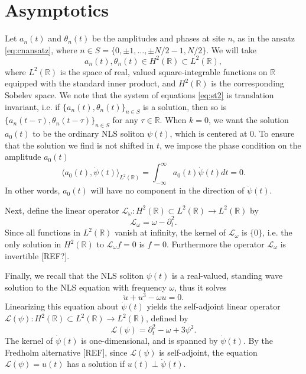 \documentclass[11pt,reqno]{amsart}
\def\R{{\mathbb R}}
\def\calL{{\mathcal L}}
\def\Lw{{\mathcal{L}_\omega}}
\begin{document}
\section{Asymptotics}\label{app:asymp}

Let $a_n(t)$ and $\theta_n(t)$ be the amplitudes and phases at site $n$, as in the ansatz \cref{eq:cnansatz}, where $n \in S = \{ 0, \pm 1, \dots, \pm N/2-1, N/2 \}$. We will take 
\[
a_n(t), \theta_n(t) \in H^2(\R) \subset L^2(\R),
\]
where $L^2(\R)$ is the space of real, valued square-integrable functions on $\R$ equipped with the standard inner product, and $H^2(\R)$ is the corresponding Sobelev space. We note that the system of equations \cref{eq:st2} is translation invariant, i.e. if $\{ a_n(t), \theta_n(t)\}_{n\in S}$ is a solution, then so is $\{ a_n(t-\tau), \theta_n(t-\tau)\}_{n\in S}$ for any $\tau \in \R$. When $k = 0$, we want the solution $a_0(t)$ to be the ordinary NLS soliton $\psi(t)$, which is centered at 0. To ensure that the solution we find is not shifted in $t$, we impose the phase condition on the amplitude $a_0(t)$
\begin{equation}\label{eq:phasecond}
\langle a_0(t), \dot{\psi}(t) \rangle_{L^2(\R)} = \int_{-\infty}^\infty a_0(t) \dot{\psi}(t) dt = 0.
\end{equation}
In other words, $a_0(t)$ will have no component in the direction of $\dot{\psi}(t)$.

Next, define the linear operator $\Lw: H^2(\R) \subset L^2(\R) \rightarrow L^2(\R)$ by
\begin{equation}\label{eq:Lw}
\Lw = \omega - \partial_t^2.
\end{equation}
Since all functions in $L^2(\R)$ vanish at infinity, the kernel of $\Lw$ is $\{0\}$, i.e. the only solution in $H^2(\R)$ to $\Lw f = 0$ is $f = 0$. Furthermore the operator $\Lw$ is invertible [REF?].

Finally, we recall that the NLS soliton $\psi(t)$ is a real-valued, standing wave solution to the NLS equation with frequency $\omega$, thus it solves 
\begin{equation}\label{eq:NLSreal}
\ddot{u} + u^3 - \omega u = 0. 
\end{equation}
Linearizing this equation about $\dot{\psi}(t)$ yields the self-adjoint linear operator $\calL(\psi): H^2(\R) \subset L^2(\R) \rightarrow L^2(\R)$, defined by
\begin{equation}\label{eq:Lpsi}
\calL(\psi) = \partial_t^2 - \omega + 3 \psi^2.
\end{equation}
The kernel of $\dot{\psi}(t)$ is one-dimensional, and is spanned by $\dot{\psi}(t)$. By the Fredholm alternative [REF], since $\calL(\psi)$ is self-adjoint, the equation $\calL(\psi) = u(t)$ has a solution if $u(t) \perp \dot{\psi}(t)$.
\end{document}
